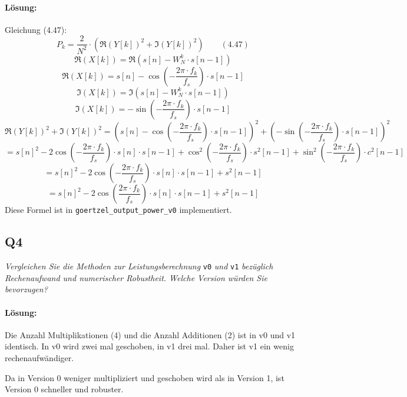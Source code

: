 \documentclass[a4,paper,fleqn]{article}
\begin{document}
\paragraph{Lösung: }
Gleichung (4.47):
\[
    P_k =
    \frac{2}{N^2} \cdot
    \left(
        \Re(Y[k])^2 + \Im(Y[k])^2
    \right)
    \qquad (4.47)
\]
\[
\Re(X[k]) = \Re(s[n] - W^k_N \cdot s[n-1])
\]
\[
\Re(X[k]) = s[n] - \cos\left(-\frac{2 \pi\cdot f_k}{f_s}\right)\cdot s[n-1]
\]
\[
\Im(X[k]) = \Im(s[n] - W^k_N \cdot s[n-1])
\]
\[
\Im(X[k]) = -\sin\left(-\frac{2 \pi\cdot f_k}{f_s}\right)\cdot s[n-1]
\]
\[
        \Re(Y[k])^2 + \Im(Y[k])^2 = \left(s[n] - \cos\left(-\frac{2 \pi\cdot f_k}{f_s}\right)\cdot s[n-1] \right)^2 + \left( -\sin\left(-\frac{2 \pi\cdot f_k}{f_s}\right)\cdot s[n-1]\right)^2
\]
\[
 = s[n]^2 - 2\cos\left(-\frac{2\pi \cdot f_k}{f_s}\right)\cdot s[n]\cdot s[n-1] + \cos^2\left(-\frac{2\pi\cdot f_k}{f_s}\right)\cdot s^2[n-1] + \sin^2\left(-\frac{2\pi\cdot f_k}{f_s}\right)\cdot c^2[n-1]
\]
\[
 = s[n]^2 - 2\cos\left(-\frac{2\pi \cdot f_k}{f_s}\right)\cdot s[n]\cdot s[n-1] + s^2[n-1]
\]
\[
 = s[n]^2 - 2\cos\left(\frac{2\pi \cdot f_k}{f_s}\right)\cdot s[n]\cdot s[n-1] + s^2[n-1]
\]
Diese Formel ist in \verb?goertzel_output_power_v0? implementiert.

\subsection{Q4}
\label{q4}
\emph{Vergleichen Sie die Methoden zur Leistungsberechnung}
\verb?v0?
\emph{und}
\verb?v1?
\emph{bezüglich Rechenaufwand und numerischer Robustheit. Welche Version 
würden Sie bevorzugen?}
\paragraph{Lösung: }
Die Anzahl Multiplikationen (4) und die Anzahl Additionen (2) ist in v0 und v1 
identisch. In v0 wird zwei mal geschoben, in v1 drei mal. Daher ist v1 ein 
wenig rechenaufwändiger. 

Da in Version 0  weniger multipliziert und geschoben wird als in Version 1, ist Version 0 schneller und robuster.
\end{document}
